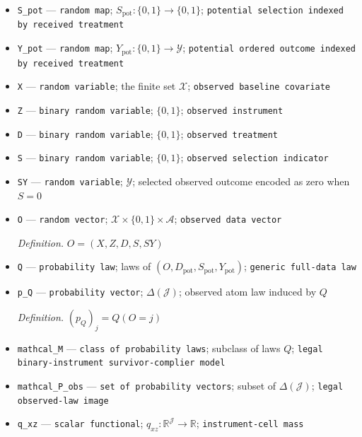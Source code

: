 \documentclass{article}
\begin{document}
\begin{itemize}
  \par\smallskip\noindent\emph{Definition.} \(C=\{D_{\mathrm{pot}}(1)>D_{\mathrm{pot}}(0)\}\)
  \item \texttt{S\_\allowbreak{}pot} --- \texttt{random map}; \(S_{\mathrm{pot}}:\{0,1\}\to\{0,1\}\); \texttt{potential selection indexed by received treatment}
  \item \texttt{Y\_\allowbreak{}pot} --- \texttt{random map}; \(Y_{\mathrm{pot}}:\{0,1\}\to\mathcal Y\); \texttt{potential ordered outcome indexed by received treatment}
  \item \texttt{X} --- \texttt{random variable}; the finite set \(\mathcal X\); \texttt{observed baseline covariate}
  \item \texttt{Z} --- \texttt{binary random variable}; \(\{0,1\}\); \texttt{observed instrument}
  \item \texttt{D} --- \texttt{binary random variable}; \(\{0,1\}\); \texttt{observed treatment}
  \item \texttt{S} --- \texttt{binary random variable}; \(\{0,1\}\); \texttt{observed selection indicator}
  \item \texttt{SY} --- \texttt{random variable}; \(\mathcal Y\); selected observed outcome encoded as zero when \(S=0\)
  \item \texttt{O} --- \texttt{random vector}; \(\mathcal X\times\{0,1\}\times\mathcal A\); \texttt{observed data vector}
  \par\smallskip\noindent\emph{Definition.} \(O=(X,Z,D,S,SY)\)
  \item \texttt{Q} --- \texttt{probability law}; laws of \((O,D_{\mathrm{pot}},S_{\mathrm{pot}},Y_{\mathrm{pot}})\); \texttt{generic full-\allowbreak{}data law}
  \item \texttt{p\_\allowbreak{}Q} --- \texttt{probability vector}; \(\Delta(\mathcal J)\); observed atom law induced by \(Q\)
  \par\smallskip\noindent\emph{Definition.} \((p_Q)_j=Q(O=j)\)
  \item \texttt{mathcal\_\allowbreak{}M} --- \texttt{class of probability laws}; subclass of laws \(Q\); \texttt{legal binary-\allowbreak{}instrument survivor-\allowbreak{}complier model}
  \item \texttt{mathcal\_\allowbreak{}P\_\allowbreak{}obs} --- \texttt{set of probability vectors}; subset of \(\Delta(\mathcal J)\); \texttt{legal observed-\allowbreak{}law image}
  \item \texttt{q\_\allowbreak{}xz} --- \texttt{scalar functional}; \(q_{xz}:\mathbb R^{\mathcal J}\to\mathbb R\); \texttt{instrument-\allowbreak{}cell mass}

\end{itemize}
\end{document}
